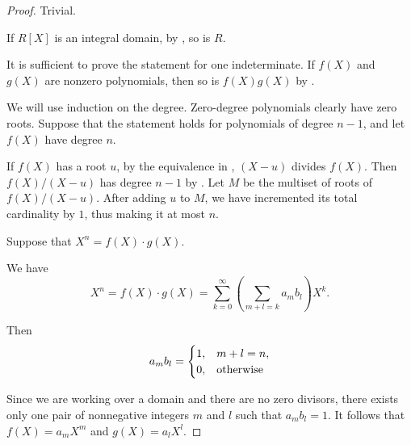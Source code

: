 \begin{proof}
   Trivial.


  \NecessitySubProof* If \( R[X] \) is an integral domain, by , so is \( R \).

  \SufficiencySubProof* It is sufficient to prove the statement for one indeterminate. If \( f(X) \) and \( g(X) \) are nonzero polynomials, then so is \( f(X) g(X) \) by .

   We will use induction on the degree. Zero-degree polynomials clearly have zero roots. Suppose that the statement holds for polynomials of degree \( n - 1 \), and let \( f(X) \) have degree \( n \).

  If \( f(X) \) has a root \( u \), by the equivalence in , \( (X - u) \) divides \( f(X) \). Then \( f(X) / (X - u) \) has degree \( n - 1 \) by . Let \( M \) be the multiset of roots of \( f(X) / (X - u) \). After adding \( u \) to \( M \), we have incremented its total cardinality by \( 1 \), thus making it at most \( n \).

   Suppose that \( X^n = f(X) \cdot g(X) \).

  We have
  \begin{equation*}
    X^n
    =
    f(X) \cdot g(X)
    =
    \sum_{k=0}^\infty (\sum_{m+l=k} a_m b_l) X^k.
  \end{equation*}

  Then
  \begin{equation*}
    a_m b_l = \begin{cases}
      1, &m + l = n, \\
      0, &\T{otherwise}
    \end{cases}
  \end{equation*}

  Since we are working over a domain and there are no zero divisors, there exists only one pair of nonnegative integers \( m \) and \( l \) such that \( a_m b_l = 1 \). It follows that \( f(X) = a_m X^m \) and \( g(X) = a_l X^l \).
\end{proof}

